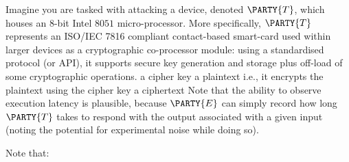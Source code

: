 %



Imagine you are tasked with attacking a device, denoted 
$\PARTY{T}$, 
which houses an $8$-bit Intel $8051$ micro-processor.  More specifically,
$\PARTY{T}$ 
represents an ISO/IEC 7816 compliant contact-based smart-card used within 
larger devices as a cryptographic co-processor module: 
using a standardised protocol (or API), it supports secure key generation 
and storage plus off-load of some cryptographic operations.
\DESCINTRO[leak]
{}
{a cipher key}
{a  plaintext}
{i.e., it encrypts the plaintext using the cipher key}
{a ciphertext}
Note that the ability to observe 
execution latency 
is plausible, because
$\PARTY{E}$ 
can simply record how long
$\PARTY{T}$ 
takes to respond with the output associated with a given input (noting the potential for experimental noise while doing so).




%
Note that:

